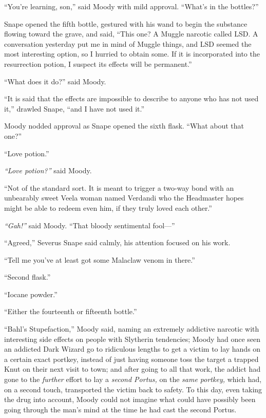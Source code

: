``You're learning, son,'' said Moody with mild approval. ``What's in the
bottles?''

Snape opened the fifth bottle, gestured with his wand to begin the
substance flowing toward the grave, and said, ``This one? A Muggle
narcotic called LSD. A conversation yesterday put me in mind of Muggle
things, and LSD seemed the most interesting option, so I hurried to
obtain some. If it is incorporated into the resurrection potion, I
suspect its effects will be permanent.''

``What does it do?'' said Moody.

``It is said that the effects are impossible to describe to anyone who
has not used it,'' drawled Snape, ``and I have not used it.''

Moody nodded approval as Snape opened the sixth flask. ``What about that
one?''

``Love potion.''

\emph{``Love potion?''} said Moody.

``Not of the standard sort. It is meant to trigger a two-way bond with
an unbearably sweet Veela woman named Verdandi who the Headmaster hopes
might be able to redeem even him, if they truly loved each other.''

\emph{``Gah!''} said Moody. ``That bloody sentimental fool---''

``Agreed,'' Severus Snape said calmly, his attention focused on his
work.

``Tell me you've at least got some Malaclaw venom in there.''

``Second flask.''

``Iocane powder.''

``Either the fourteenth or fifteenth bottle.''

``Bahl's Stupefaction,'' Moody said, naming an extremely addictive
narcotic with interesting side effects on people with Slytherin
tendencies; Moody had once seen an addicted Dark Wizard go to ridiculous
lengths to get a victim to lay hands on a certain exact portkey, instead
of just having someone toss the target a trapped Knut on their next
visit to town; and after going to all that work, the addict had gone to
the \emph{further} effort to lay a \emph{second Portus,} on the
\emph{same portkey,} which had, on a second touch, transported the
victim back to safety. To this day, even taking the drug into account,
Moody could not imagine what could have possibly been going through the
man's mind at the time he had cast the second Portus.

